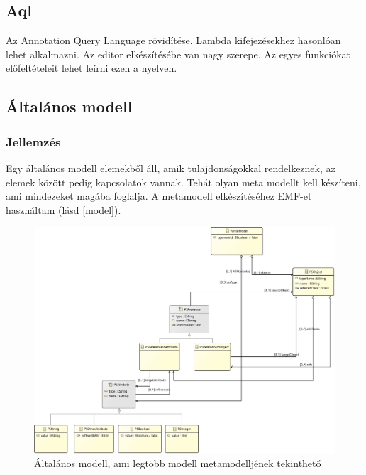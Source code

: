 \subsection{Aql}
\nocite{Acceleo}
\nocite{OCL}
Az Annotation Query Language \cite{Aql} rövidítése. Lambda \cite{Lambda} kifejezésekhez hasonlóan lehet alkalmazni. 
Az editor elkészítésébe van nagy szerepe. Az egyes funkciókat előfeltételeit lehet leírni ezen a nyelven. 


\subsection{Általános modell}

\subsubsection{Jellemzés}
Egy általános modell elemekből áll, amik tulajdonságokkal rendelkeznek, az elemek között pedig kapcsolatok vannak. Tehát olyan meta modellt kell készíteni, ami mindezeket magába foglalja. A metamodell elkészítéséhez EMF-et használtam (lásd \autoref{model}).

\begin{figure}[!ht]
	\centering
	\includegraphics[width=150mm]{figures/partialmodel01.pdf}
	\caption{Általános modell, ami legtöbb modell metamodelljének tekinthető} 
	\label{model}
\end{figure}

